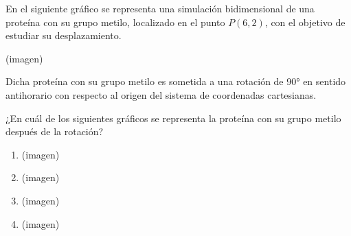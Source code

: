 \begin{problem}
    En el siguiente gráfico se representa una simulación bidimensional de una proteína con su grupo metilo, localizado en el punto $P(6, 2)$, con el objetivo de estudiar su desplazamiento.

    \begin{center}
    (imagen)
    \end{center}

    Dicha proteína con su grupo metilo es sometida a una rotación de \ang{90} en sentido antihorario con respecto al origen del sistema de coordenadas cartesianas.

    ¿En cuál de los siguientes gráficos se representa la proteína con su grupo metilo después de la rotación?

    \begin{enumerate}[label=\Alph*.]
        \item (imagen)
        \item (imagen)
        \item (imagen)
        \item (imagen)
    \end{enumerate}
\end{problem}
